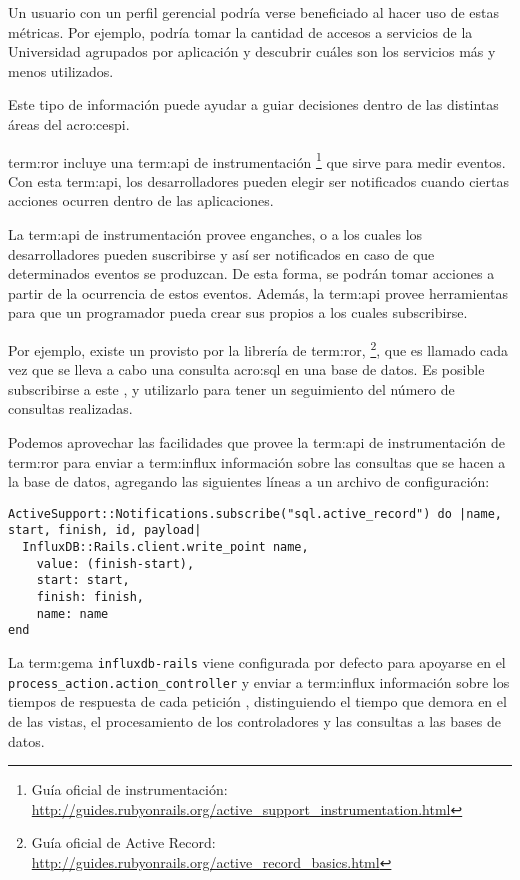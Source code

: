 Un usuario con un perfil gerencial podría verse beneficiado al hacer uso de
estas métricas. Por ejemplo, podría tomar la cantidad de accesos a servicios de
la Universidad agrupados por aplicación y descubrir cuáles son los servicios
más y menos utilizados.

Este tipo de información puede ayudar a guiar decisiones dentro de las
distintas áreas del \gls{acro:cespi}.

\gls{term:ror} incluye una \gls{term:api} de instrumentación
\footnote{Guía oficial de instrumentación:
\url{http://guides.rubyonrails.org/active_support_instrumentation.html}}
que sirve para medir eventos. Con esta \gls{term:api}, los desarrolladores
pueden elegir ser notificados cuando ciertas acciones ocurren dentro de las
aplicaciones.

La \gls{term:api} de instrumentación provee enganches, o  a los
cuales los desarrolladores pueden suscribirse y así ser notificados en caso de
que determinados eventos se produzcan. De esta forma, se podrán tomar acciones
a partir de la ocurrencia de estos eventos. Además, la \gls{term:api} provee
herramientas para que un programador pueda crear sus propios  a los
cuales subscribirse.

Por ejemplo, existe un  provisto por la librería de \gls{term:ror},
\footnote{Guía oficial de Active Record:
\url{http://guides.rubyonrails.org/active_record_basics.html}}, que es
llamado cada vez que se lleva a cabo una consulta \gls{acro:sql} en una base de datos. Es
posible subscribirse a este , y utilizarlo para tener un seguimiento
del número de consultas realizadas.

Podemos aprovechar las facilidades que provee la \gls{term:api} de
instrumentación de \gls{term:ror} para enviar a \gls{term:influx} información
sobre las consultas que se hacen a la base de datos, agregando las siguientes
líneas a un archivo de configuración:

\begin{lstlisting}
ActiveSupport::Notifications.subscribe("sql.active_record") do |name, start, finish, id, payload|
  InfluxDB::Rails.client.write_point name,
    value: (finish-start),
    start: start,
    finish: finish,
    name: name
end
\end{lstlisting}

La \gls{term:gema} \texttt{influxdb-rails} viene configurada por defecto para
apoyarse en el  \lstinline{process_action.action_controller} y
enviar a \gls{term:influx} información sobre los tiempos de respuesta de cada
petición , distinguiendo el tiempo que demora en el 
de las vistas, el procesamiento de los controladores y las consultas a las bases
de datos.

